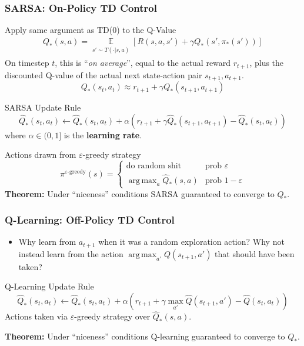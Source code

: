 \documentclass[10pt,a4paper, handout]{beamer}
\DeclareMathOperator*{\argmax}{arg\,max}
\begin{document}
%
\begin{frame}
	\frametitle{SARSA: On-Policy TD Control}
Apply same argument as TD(0) to the Q-Value
\begin{align*}
	Q_*(s,a) = 
	\underset{\substack{s' \sim T(\cdot | s, a)}}{\mathbb{E}} \left[ R(s,a,s') + \gamma Q_*(s', \pi_*(s')) \right]
\end{align*}
\pause
On timestep $t$, this is ``\textit{on average}'', equal to the actual reward $r_{t+1}$, plus the discounted Q-value of the actual next state-action pair $s_{t+1},a_{t+1}$.
$$
Q_{*}(s_t, a_t) \approx r_{t+1} + \gamma Q_{*}(s_{t+1}, a_{t+1})
$$
\pause
\begin{block}{SARSA Update Rule}
$$
\hat{Q}_*(s_t, a_t) \leftarrow  \hat{Q}_*(s_t, a_t) + \alpha 
\left( r_{t+1} + \gamma \hat{Q}_*(s_{t+1}, a_{t+1}) - \hat{Q}_*(s_t, a_t) \right) 
$$
where $\alpha \in (0,1]$ is the \textbf{learning rate}.
\end{block}
\pause
Actions drawn from $\varepsilon$-greedy strategy 
$$
\pi^{\varepsilon\text{-greedy}}(s) = \begin{cases}
 \text{do random shit} & \text{prob } \varepsilon \\
 \argmax_a \hat{Q}_*(s,a) & \text{prob } 1-\varepsilon 
\end{cases}
$$
\pause
\textbf{Theorem:} Under ``niceness'' conditions 
SARSA guaranteed to converge to $Q_*$. 
	
\end{frame}

%
\begin{frame}
\frametitle{Q-Learning: Off-Policy TD Control}
	\begin{itemize}
		\item Why learn from $a_{t+1}$ when it was a random exploration action? 
		Why not instead learn
		from the action $\argmax_{a'} Q(s_{t+1}, a')$ that should have been taken?
	\end{itemize}
	\pause
	
\begin{block}{Q-Learning Update Rule}
$$
\hat{Q}_*(s_t, a_t)  \leftarrow \hat{Q}_*(s_t,a_t)
+ \alpha \left( 
r_{t+1} + \gamma \max_{a'} \hat{Q}(s_{t+1}, a') - \hat{Q}(s_t, a_t)
\right)
$$
Actions taken via $\varepsilon$-greedy strategy over $\hat{Q}_*(s,a)$.
\end{block}
\pause
\textbf{Theorem:} Under ``niceness'' conditions 
Q-learning guaranteed to converge to $Q_*$. 
\end{frame}
\end{document}
